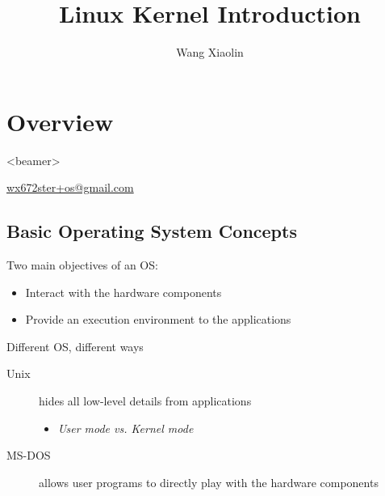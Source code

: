 
\section{Overview}

\begin{frame}<beamer>
  \title{Linux Kernel Introduction}
  \author{Wang Xiaolin}
  \titlepage
  \vfill
  {\small{} \url{wx672ster+os@gmail.com} }
\end{frame}

\subsection{Basic Operating System Concepts}

\begin{frame}
  \begin{minipage}{.7\linewidth}
    \begin{block}{Two main objectives of an OS:}
      \begin{itemize}
      \item Interact with the hardware components
      \item Provide an execution environment to the applications
      \end{itemize}
    \end{block}
    \begin{block}{Different OS, different ways}
      \begin{description}
      \item[Unix] hides all low-level details from applications
        \begin{itemize}
        \item[] \emph{User mode vs. Kernel mode}
        \end{itemize}
      \item[MS-DOS] allows user programs to directly play with the hardware components
      \end{description}
    \end{block}
  \end{minipage}\hfill
  \begin{minipage}{.28\linewidth}
    \begin{center}
       
    \end{center}
  \end{minipage}
\end{frame}

